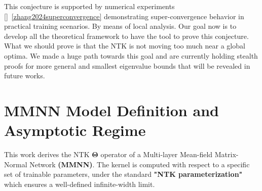 \documentclass[11pt]{article}
\begin{document}
This conjecture is supported by numerical experiments []~\ref{zhang2024superconvergence} demonstrating super-convergence behavior in practical training scenarios.
By means of local analysis. Our goal now is to develop all the theoretical framework to have the tool to prove this conjecture. 
What we should prove is that the NTK is not moving too much near a global optima. We made a huge path towards this goal and are currently
holding stealth proofs for more general and smallest eigenvalue bounds that will be revealed in future works.


\newpage

\section{MMNN Model Definition and Asymptotic Regime}

\begin{tcolorbox}[colback=green!15,colframe=green!80!black,title={\textbf{Objective and Scope}},enhanced,drop shadow,boxrule=2pt]
This work derives the NTK $\boldsymbol{\Theta}$ operator of a Multi-layer Mean-field Matrix-Normal Network \textbf{(MMNN)}. 
The kernel is computed with respect to a specific set of trainable parameters, under the standard \textbf{"NTK parameterization"} 
which ensures a well-defined infinite-width limit.
\end{tcolorbox}
\end{document}
